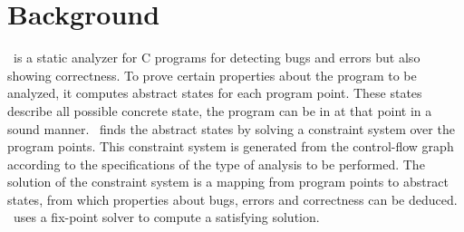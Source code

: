 \section{Background}
\label{sec:background}
\gob\ is a static analyzer for C programs for detecting bugs and errors but also showing correctness. To prove certain properties about the program to be analyzed, it computes abstract states for each program point. These states describe all possible concrete state, the program can be in at that point in a sound manner. \gob\ finds the abstract states by solving a constraint system over the program points. This constraint system is generated from the control-flow graph according to the specifications of the type of analysis to be performed. The solution of the constraint system is a mapping from program points to abstract states, from which properties about bugs, errors and correctness can be deduced. \gob\ uses a fix-point solver to compute a satisfying solution.

